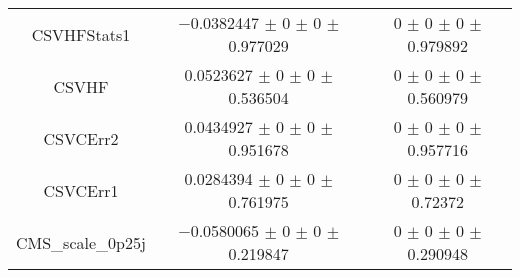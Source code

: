 \begin{table}
\begin{tabular}{ccc}
CSVHFStats1 & \num{-0.0382447} $\pm$ \num{0} $\pm$ \num{0} $\pm$ \num{0.977029} & \num{0} $\pm$ \num{0} $\pm$ \num{0} $\pm$ \num{0.979892}\\
CSVHF & \num{0.0523627} $\pm$ \num{0} $\pm$ \num{0} $\pm$ \num{0.536504} & \num{0} $\pm$ \num{0} $\pm$ \num{0} $\pm$ \num{0.560979}\\
CSVCErr2 & \num{0.0434927} $\pm$ \num{0} $\pm$ \num{0} $\pm$ \num{0.951678} & \num{0} $\pm$ \num{0} $\pm$ \num{0} $\pm$ \num{0.957716}\\
CSVCErr1 & \num{0.0284394} $\pm$ \num{0} $\pm$ \num{0} $\pm$ \num{0.761975} & \num{0} $\pm$ \num{0} $\pm$ \num{0} $\pm$ \num{0.72372}\\
CMS\_scale\_0p25j & \num{-0.0580065} $\pm$ \num{0} $\pm$ \num{0} $\pm$ \num{0.219847} & \num{0} $\pm$ \num{0} $\pm$ \num{0} $\pm$ \num{0.290948}\\
\bottomrule
\end{tabular}
\end{table}